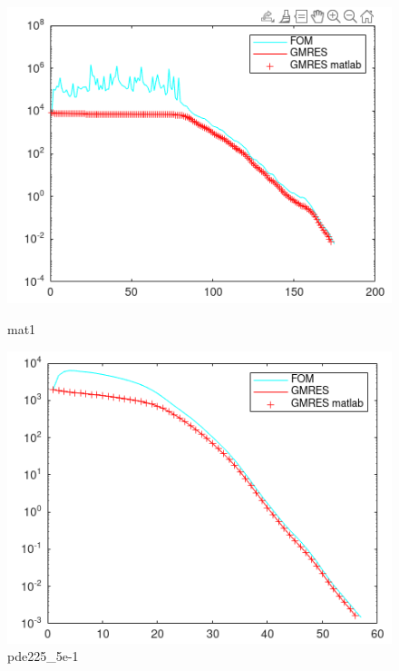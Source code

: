 \documentclass[12pt,a4paper]{article}
\begin{document}
\begin{figure}[H]
    \centering
    \begin{minipage}{0.45\textwidth}
        \centering
        \includegraphics[width=\textwidth]{src/mat1.png}
        \caption{mat1}
    \end{minipage}
    \hfill
    \begin{minipage}{0.45\textwidth}
        \centering
        \includegraphics[width=\textwidth]{src/pde.png}
        \caption{pde225\_5e-1}
    \end{minipage}
    \hfill
    \begin{minipage}{0.45\textwidth}
        \centering

\end{minipage}
\end{figure}
\end{document}
